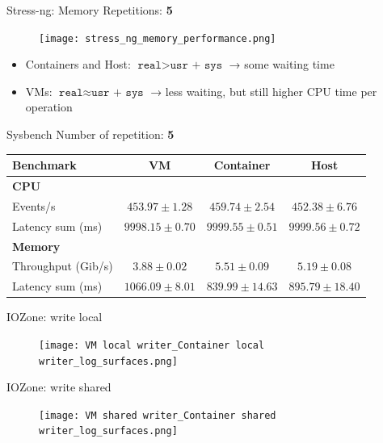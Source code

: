 \documentclass[10pt]{beamer}
\begin{document}
\begin{frame}{Stress-ng: Memory}
  Repetitions: \textbf{5}
  \begin{figure}
    \centering
    \texttt{[image: stress\_ng\_memory\_performance.png]}
  \end{figure}
  \begin{itemize}
    \item Containers and Host: $\texttt{real} > \texttt{usr + sys}$ → some waiting time
    \item VMs: $\texttt{real} \approx \texttt{usr + sys}$ → less waiting, but still higher CPU time per operation
  \end{itemize}
\end{frame}


\begin{frame}{Sysbench}
  Number of repetition: \textbf{5}
  \begin{table}[htbp]
    \centering
    \footnotesize
    \begin{tabular}{lccc}
    \toprule
    \textbf{Benchmark} & \textbf{VM} & \textbf{Container} & \textbf{Host} \\
    \midrule
    \textbf{CPU} & & & \\
    Events/s & $453.97 \pm 1.28$ & $459.74 \pm 2.54$ & $452.38 \pm 6.76$ \\
    Latency sum (ms) & $9998.15 \pm 0.70$ & $9999.55 \pm 0.51$ & $9999.56 \pm 0.72$ \\
    \midrule
    \textbf{Memory} & & & \\
    Throughput (Gib/s) & $3.88 \pm 0.02$ & $\mathbf{5.51 \pm 0.09}$ & $5.19 \pm 0.08$ \\
    Latency sum (ms) & $1066.09 \pm 8.01$ & $\mathbf{839.99 \pm 14.63}$ & $895.79 \pm 18.40$ \\
    \bottomrule
    \end{tabular}
\end{table}
\end{frame}

\begin{frame}{IOZone: write local}
  \begin{figure}
    \centering
    \texttt{[image: VM local writer\_Container local writer\_log\_surfaces.png]}
  \end{figure}
\end{frame}

\begin{frame}{IOZone: write shared}
  \begin{figure}
    \centering
    \texttt{[image: VM shared writer\_Container shared writer\_log\_surfaces.png]}
  \end{figure}
\end{frame}
\end{document}
